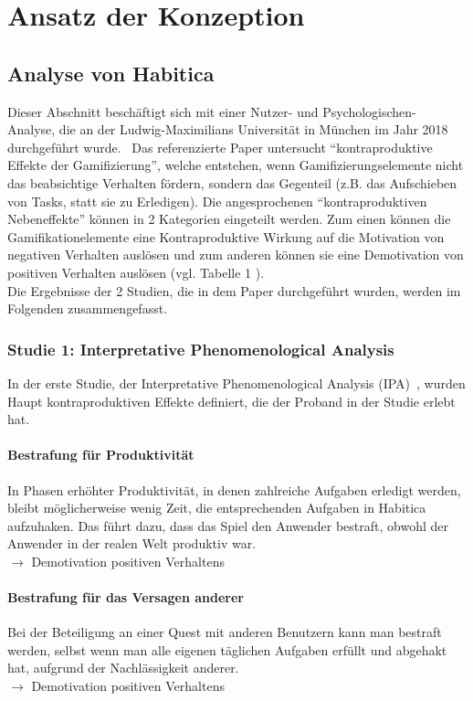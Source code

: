 \documentclass[sigconf, nonacm]{acmart}
\begin{document}
\section{Ansatz der Konzeption}

\subsection{Analyse von Habitica}\label{sec:analysis}
Dieser Abschnitt beschäftigt sich mit einer Nutzer- und Psychologischen- Analyse, die an der Ludwig-Maximilians Universität in München im Jahr 2018 durchgeführt wurde.~\cite{diefenbach_counterproductive_2019} Das referenzierte Paper untersucht \enquote{kontraproduktive Effekte der Gamifizierung}, welche entstehen, wenn Gamifizierungselemente nicht das beabsichtige Verhalten fördern, sondern das Gegenteil (z.B. das Aufschieben von Tasks, statt sie zu Erledigen). 
Die angesprochenen \enquote{kontraproduktiven Nebeneffekte} können in 2 Kategorien eingeteilt werden. Zum einen können die Gamifikationelemente eine Kontraproduktive Wirkung auf die Motivation von negativen Verhalten auslösen und zum anderen können sie eine Demotivation von positiven Verhalten auslösen (vgl. Tabelle 1 \cite{diefenbach_counterproductive_2019}).
\\
Die Ergebnisse der 2 Studien, die in dem Paper durchgeführt wurden, werden im Folgenden zusammengefasst.
\\
\subsubsection{Studie 1: Interpretative Phenomenological Analysis}
In der erste Studie, der  Interpretative Phenomenological Analysis (IPA)~\cite{smith_reflecting_2004}, wurden Haupt kontraproduktiven Effekte definiert, die der Proband in der Studie erlebt hat.

\paragraph{Bestrafung für Produktivität}\label{sec:cpe1}
In Phasen erhöhter Produktivität, in denen zahlreiche Aufgaben erledigt werden, bleibt möglicherweise wenig Zeit, die entsprechenden Aufgaben in Habitica aufzuhaken. Das führt dazu, dass das Spiel den Anwender bestraft, obwohl der Anwender in der realen Welt produktiv war.\\
$\rightarrow$ Demotivation positiven Verhaltens

\paragraph{Bestrafung für das Versagen  anderer}\label{sec:cpe2}
Bei der Beteiligung an einer Quest mit anderen Benutzern kann man bestraft werden, selbst wenn man alle eigenen täglichen Aufgaben erfüllt und abgehakt hat, aufgrund der Nachlässigkeit anderer.\\
$\rightarrow$ Demotivation positiven Verhaltens
\end{document}
